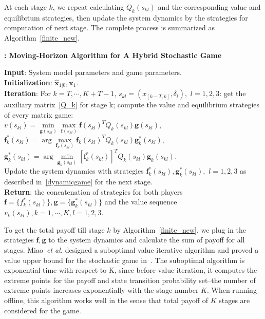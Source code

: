 At each stage $k$, we repeat calculating $Q_{k}(s_{kl})$ and the corresponding value and equilibrium strategies, then update the system dynamics by the strategies for computation of next stage. The complete process is summarized as Algorithm~\ref{finite_new}. 
\begin{algorithm}
\caption{\textbf{: Moving-Horizon Algorithm for A Hybrid Stochastic Game}}
\textbf{Input}: System model parameters and game parameters.
\\\textbf{Initialization}: $\hat{\mathbf{x}}_{1|0}, \mathbf{x}_1$.
\\\textbf{Iteration}: For $k=T, \cdots, K+T-1$,                                                                                 
 $s_{kl}=(x_{[k-T,k]},\delta_l),$  $l=1,2,3$:  
get  the auxiliary matrix~\eqref{Q_k} for stage k;
compute the value and equilibrium strategies of every matrix game:\\
$v(s_{kl})= \min\limits_{\mathbf{g}(s_{kl})}\max\limits_{\mathbf{f}(s_{kl})} \mathbf{f}(s_{kl})^T Q_{k}(s_{kl}) \mathbf{g}(s_{kl})$,\\
$\mathbf{f}_k^{*}(s_{kl})=\arg \max\limits_{\mathbf{f}_k(s_{kl})}\mathbf{f}_k(s_{kl})^T Q_{k}(s_{kl} )\mathbf{g}_k^*(s_{kl})$, \\
$\mathbf{g}_k^{*}(s_{kl})=\arg \min\limits_{\mathbf{g}_k(s_{kl})} [\mathbf{f}_k^{*}(s_{kl})]^T Q_{k}(s_{kl}) \mathbf{g}_k(s_{kl})$.\\
Update the system dynamics with strategies $\mathbf{f}_k^{*}(s_{kl}),\mathbf{g}_k^{*}(s_{kl}),$ $l=1,2,3$ as described in~\ref{dynamicgame} for the next stage.
\\\textbf{Return}: the concatenation of strategies for both players $\mathbf{f}=\{f_k^{*}(s_{kl})\},\mathbf{g}=\{\mathbf{g}^*_k(s_{kl})\}$ and the value sequence $v_{k}(s_{kl}),k=1,\cdots, K, l=1,2,3$.
\label{finite_new}
\end{algorithm}
To get the total payoff till stage $k$ by Algorithm~\ref{finite_new}, we plug in the strategies $\mathbf{f}, \mathbf{g}$ to the system dynamics and calculate the sum of payoff for all stages.%
\iffalse
Miao~\textit{et al.} designed a suboptimal value iterative algorithm and proved a value upper bound for the stochastic game in~\cite{cdc_replay}. The suboptimal algorithm is exponential time with respect to K, since before value iteration, it computes the extreme points for the payoff and state transition probability set--the number of extreme points increases exponentially with the stage number $K$.  When running offline, this algorithm works well in the sense that total payoff of $K$ stages  are considered for the game.   

